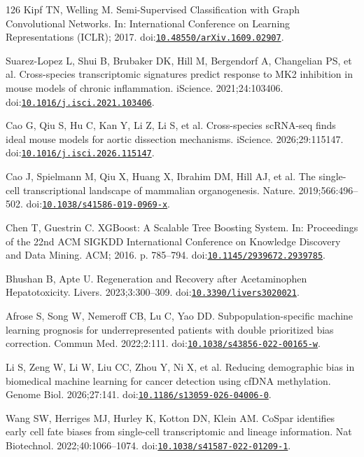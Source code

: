 \begin{thebibliography}{126}
Kipf TN, Welling M. Semi-Supervised Classification with Graph Convolutional Networks. In: International Conference on Learning Representations (ICLR); 2017. doi:\href{https://doi.org/10.48550/arXiv.1609.02907}{\nolinkurl{10.48550/arXiv.1609.02907}}.

Suarez-Lopez L, Shui B, Brubaker DK, Hill M, Bergendorf A, Changelian PS, et al. Cross-species transcriptomic signatures predict response to MK2 inhibition in mouse models of chronic inflammation. iScience. 2021;24:103406. doi:\href{https://doi.org/10.1016/j.isci.2021.103406}{\nolinkurl{10.1016/j.isci.2021.103406}}.

Cao G, Qiu S, Hu C, Kan Y, Li Z, Li S, et al. Cross-species scRNA-seq finds ideal mouse models for aortic dissection mechanisms. iScience. 2026;29:115147. doi:\href{https://doi.org/10.1016/j.isci.2026.115147}{\nolinkurl{10.1016/j.isci.2026.115147}}.

Cao J, Spielmann M, Qiu X, Huang X, Ibrahim DM, Hill AJ, et al. The single-cell transcriptional landscape of mammalian organogenesis. Nature. 2019;566:496--502. doi:\href{https://doi.org/10.1038/s41586-019-0969-x}{\nolinkurl{10.1038/s41586-019-0969-x}}.

Chen T, Guestrin C. XGBoost: A Scalable Tree Boosting System. In: Proceedings of the 22nd ACM SIGKDD International Conference on Knowledge Discovery and Data Mining. ACM; 2016. p. 785--794. doi:\href{https://doi.org/10.1145/2939672.2939785}{\nolinkurl{10.1145/2939672.2939785}}.

Bhushan B, Apte U. Regeneration and Recovery after Acetaminophen Hepatotoxicity. Livers. 2023;3:300--309. doi:\href{https://doi.org/10.3390/livers3020021}{\nolinkurl{10.3390/livers3020021}}.

Afrose S, Song W, Nemeroff CB, Lu C, Yao DD. Subpopulation-specific machine learning prognosis for underrepresented patients with double prioritized bias correction. Commun Med. 2022;2:111. doi:\href{https://doi.org/10.1038/s43856-022-00165-w}{\nolinkurl{10.1038/s43856-022-00165-w}}.

Li S, Zeng W, Li W, Liu CC, Zhou Y, Ni X, et al. Reducing demographic bias in biomedical machine learning for cancer detection using cfDNA methylation. Genome Biol. 2026;27:141. doi:\href{https://doi.org/10.1186/s13059-026-04006-0}{\nolinkurl{10.1186/s13059-026-04006-0}}.

Wang SW, Herriges MJ, Hurley K, Kotton DN, Klein AM. CoSpar identifies early cell fate biases from single-cell transcriptomic and lineage information. Nat Biotechnol. 2022;40:1066--1074. doi:\href{https://doi.org/10.1038/s41587-022-01209-1}{\nolinkurl{10.1038/s41587-022-01209-1}}.


\end{thebibliography}
